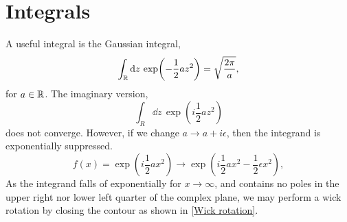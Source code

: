 \section{Integrals}
\label{section:gaussian integrals}
A useful integral is the Gaussian integral,
\begin{equation}
    \int_{\mathbb{R}} \dd z \, \exp(- \frac{1}{2} a z^2) = \sqrt{\frac{2 \pi}{a}},
\end{equation}
for $a \in \mathbb{R}$. The imaginary version,
\begin{equation}
    \int_R \dd z \, \exp(i \frac{1}{2} a z^2 )
\end{equation}
does not converge. However, if we change $a \rightarrow a + i\epsilon$, 
then the integrand is exponentially suppressed.
\begin{equation}
    f(x) = \exp(i \frac{1}{2}a x^2) \rightarrow
    \exp(i\frac{1}{2}a x^2 - \frac{1}{2} \epsilon  x^2),
\end{equation}
As the integrand falls of exponentially for $x\rightarrow \infty$, and contains no poles in the upper right nor lower left quarter of the complex plane, we may perform a wick rotation by closing the contour as shown in \autoref{Wick rotation}.
